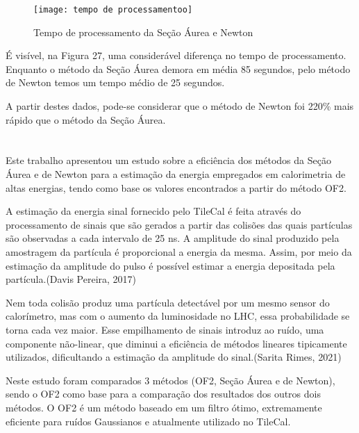 \begin{figure}[H]
    \centering
    \caption{Tempo de processamento da Seção Áurea e Newton}
    \texttt{[image: tempo de processamentoo]}
    \label{modeloNfce}
\end{figure}

É visível, na Figura 27, uma considerável diferença no tempo de processamento. Enquanto o método da Seção Áurea demora em média 85 segundos, pelo método de Newton temos um tempo médio de 25 segundos.

A partir destes dados, pode-se considerar que o método de Newton foi 220\% mais rápido que o método da Seção Áurea.

\chapter*{}
\noindent
{}
\newline
\newline

Este trabalho apresentou um estudo sobre a eficiência dos métodos da Seção Áurea e de Newton para a estimação da energia empregados em calorimetria de altas energias, tendo como base os valores encontrados a partir do método OF2.

A estimação da energia sinal fornecido pelo TileCal é feita através do processamento de sinais que são gerados a partir das colisões das quais partículas são observadas a cada intervalo de 25 ns. A amplitude do sinal produzido pela amostragem da partícula é proporcional a energia da mesma. Assim, por meio da estimação da amplitude do pulso é possível estimar a energia depositada pela partícula.(Davis Pereira, 2017)\cite{davis}

Nem toda colisão produz uma partícula detectável por um mesmo sensor do calorímetro, mas com o aumento da luminosidade no LHC, essa probabilidade se torna cada vez maior. Esse empilhamento de sinais introduz ao ruído, uma componente não-linear, que diminui a eficiência de métodos lineares tipicamente utilizados, dificultando a estimação da amplitude do sinal.(Sarita Rimes, 2021)\cite{sarita}

Neste estudo foram comparados 3 métodos (OF2, Seção Áurea e de Newton), sendo o OF2 como base para a comparação dos resultados dos outros dois métodos. O OF2 é um método baseado em um filtro ótimo, extremamente eficiente para ruídos Gaussianos e atualmente utilizado no TileCal.

